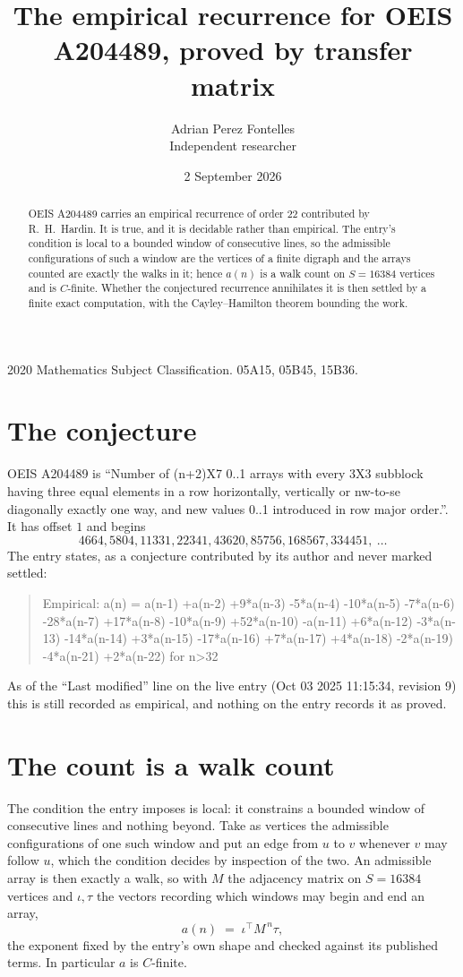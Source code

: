 \documentclass[11pt,a4paper]{article}
\title{The empirical recurrence for OEIS A204489, proved by transfer matrix}
\author{Adrian Perez Fontelles\\ \small Independent researcher}
\date{2 September 2026}
\theoremstyle{plain}
\theoremstyle{definition}
\begin{document}
\maketitle

\begin{abstract}
OEIS A204489 carries an empirical recurrence of order $22$ contributed by R.~H.~Hardin. It is
true, and it is decidable rather than empirical. The entry's condition is local to a bounded window of consecutive lines, so
the admissible configurations of such a window are the vertices of a finite digraph and the
arrays counted are exactly the walks in it; hence $a(n)$ is a walk count on $S=16384$ vertices
and is $C$-finite. Whether the conjectured recurrence annihilates it is then settled by a
finite exact computation, with the Cayley--Hamilton theorem bounding the work.
\end{abstract}

\noindent\small 2020 Mathematics Subject Classification. 05A15, 05B45, 15B36.\normalsize

\section{The conjecture}

OEIS A204489 is ``Number of (n+2)X7 0..1 arrays with every 3X3 subblock having three equal elements in a row horizontally, vertically or nw-to-se diagonally exactly one way, and new values 0..1 introduced in row major order.''. It has offset $1$ and begins
\[
4664, 5804, 11331, 22341, 43620, 85756, 168567, 334451,\ \dots
\]
The entry states, as a conjecture contributed by its author and never marked settled:
\begin{quote}
Empirical: a(n) = a(n-1) +a(n-2) +9*a(n-3) -5*a(n-4) -10*a(n-5) -7*a(n-6) -28*a(n-7) +17*a(n-8) -10*a(n-9) +52*a(n-10) -a(n-11) +6*a(n-12) -3*a(n-13) -14*a(n-14) +3*a(n-15) -17*a(n-16) +7*a(n-17) +4*a(n-18) -2*a(n-19) -4*a(n-21) +2*a(n-22) for n>32
\end{quote}
As of the ``Last modified'' line on the live entry (Oct 03 2025 11:15:34, revision 9) this is still
recorded as empirical, and nothing on the entry records it as proved.

\section{The count is a walk count}

The condition the entry imposes is local: it constrains a bounded window of consecutive lines and nothing beyond. Take as
vertices the admissible configurations of one such window and put an edge from $u$ to $v$
whenever $v$ may follow $u$, which the condition decides by inspection of the two. An
admissible array is then exactly a walk, so with $M$ the adjacency matrix on $S=16384$ vertices
and $\iota,\tau$ the vectors recording which windows may begin and end an array,
\[
a(n)\;=\;\iota^{\!\top}M^{\,n}\tau ,
\]
the exponent fixed by the entry's own shape and checked against its published terms. In
particular $a$ is $C$-finite.
\end{document}
